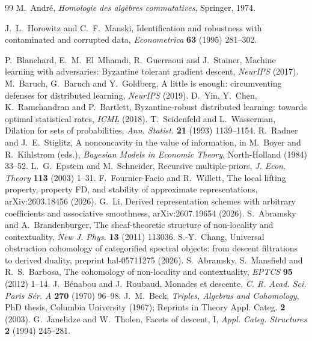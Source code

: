 \documentclass[11pt]{article}
\theoremstyle{definition}\newtheorem{definition}{Definition}\newtheorem{remark}{Remark}
\begin{document}
\begin{thebibliography}{99}
 M.~André, \emph{Homologie des algèbres commutatives}, Springer, 1974.

 J.~L.~Horowitz and C.~F.~Manski, Identification and robustness with contaminated and corrupted data, \emph{Econometrica} \textbf{63} (1995) 281--302.

 P.~Blanchard, E.~M.~El~Mhamdi, R.~Guerraoui and J.~Stainer, Machine learning with adversaries: Byzantine tolerant gradient descent, \emph{NeurIPS} (2017).
 M.~Baruch, G.~Baruch and Y.~Goldberg, A little is enough: circumventing defenses for distributed learning, \emph{NeurIPS} (2019).
 D.~Yin, Y.~Chen, K.~Ramchandran and P.~Bartlett, Byzantine-robust distributed learning: towards optimal statistical rates, \emph{ICML} (2018).
 T.~Seidenfeld and L.~Wasserman, Dilation for sets of probabilities, \emph{Ann. Statist.} \textbf{21} (1993) 1139--1154.
 R.~Radner and J.~E.~Stiglitz, A nonconcavity in the value of information, in M.~Boyer and R.~Kihlstrom (eds.), \emph{Bayesian Models in Economic Theory}, North-Holland (1984) 33--52.
 L.~G.~Epstein and M.~Schneider, Recursive multiple-priors, \emph{J. Econ. Theory} \textbf{113} (2003) 1--31.
 F.~Fournier-Facio and R.~Willett, The local lifting property, property FD, and stability of approximate representations, arXiv:2603.18456 (2026).
 G.~Li, Derived representation schemes with arbitrary coefficients and associative smoothness, arXiv:2607.19654 (2026).
 S.~Abramsky and A.~Brandenburger, The sheaf-theoretic structure of non-locality and contextuality, \emph{New J. Phys.} \textbf{13} (2011) 113036.
 S.-Y.~Chang, Universal obstruction cohomology of categorified spectral objects: from descent filtrations to derived duality, preprint hal-05711275 (2026).
 S.~Abramsky, S.~Mansfield and R.~S.~Barbosa, The cohomology of non-locality and contextuality, \emph{EPTCS} \textbf{95} (2012) 1--14.
 J.~Bénabou and J.~Roubaud, Monades et descente, \emph{C. R. Acad. Sci. Paris Sér. A} \textbf{270} (1970) 96--98.
 J.~M.~Beck, \emph{Triples, Algebras and Cohomology}, PhD thesis, Columbia University (1967); Reprints in Theory Appl. Categ. \textbf{2} (2003).
 G.~Janelidze and W.~Tholen, Facets of descent, I, \emph{Appl. Categ. Structures} \textbf{2} (1994) 245--281.

\end{thebibliography}
\end{document}
